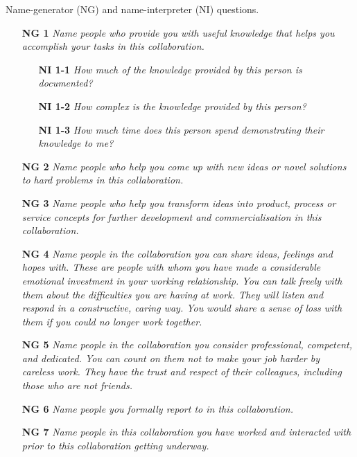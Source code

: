 \begin{table}[p]
\centering
\caption[Name-generator/interpreter questions]{Name-generator (NG) and name-interpreter (NI) questions.}
\label{tab:ng}
\begin{tcolorbox}
\begin{itemize}
\item[\textbf{NG 1}] \textit{Name people who provide you with useful knowledge that helps you accomplish your tasks in this collaboration.}
\begin{itemize}
\item[\textbf{NI 1-1}] \textit{How much of the knowledge provided by this person is documented?}
\item[\textbf{NI 1-2}] \textit{How complex is the knowledge provided by this person?}
\item[\textbf{NI 1-3}] \textit{How much time does this person spend demonstrating their knowledge to me?}
\end{itemize}
\item[\textbf{NG 2}] \textit{Name people who help you come up with new ideas or novel solutions to hard problems in this collaboration.}
\item[\textbf{NG 3}] \textit{Name people who help you transform ideas into product, process or service concepts for further development and commercialisation in this collaboration.}
\item[\textbf{NG 4}] \textit{Name people in the collaboration you can share ideas, feelings and hopes with. These are people with whom you have made a considerable emotional investment in your working relationship. You can talk freely with them about the difficulties you are having at work. They will listen and respond in a constructive, caring way. You would share a sense of loss with them if you could no longer work together.}
\item[\textbf{NG 5}] \textit{Name people in the collaboration you consider professional, competent, and dedicated. You can count on them not to make your job harder by careless work. They have the trust and respect of their colleagues, including those who are not friends.} 
\item[\textbf{NG 6}] \textit{Name people you formally report to in this collaboration.}
\item[\textbf{NG 7}] \textit{Name people in this collaboration you have worked and interacted with prior to this collaboration getting underway.}
\end{itemize}
\end{tcolorbox}
\end{table}

